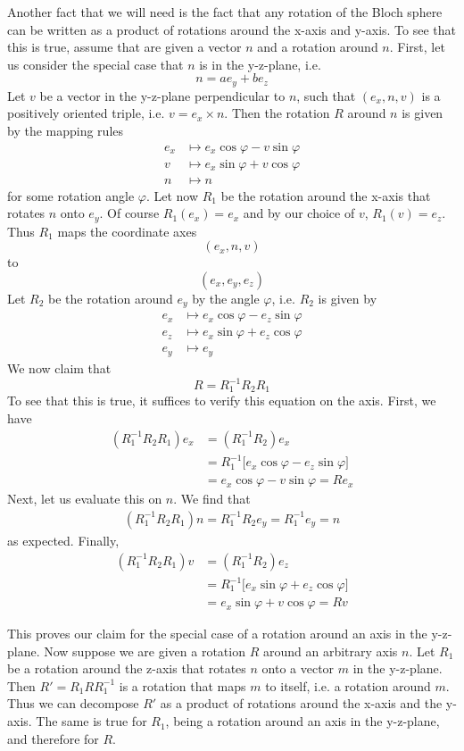 \documentclass[a4paper, draft]{article}
\theoremstyle{own}
\theoremstyle{remark}
\begin{document}
Another fact that we will need is the fact that any rotation of the Bloch sphere can be written as a product of rotations around the x-axis and y-axis. To see that this is true, assume that are given a vector $n$ and a rotation around $n$. First, let us consider the special case that $n$ is in the y-z-plane, i.e.
$$
n = a e_y + b e_z
$$
Let $v$ be a vector in the y-z-plane perpendicular to $n$, such that $(e_x, n, v)$ is a positively oriented triple, i.e. $v = e_x \times n$. Then the rotation $R$ around $n$ is given by the mapping rules
\begin{align*}
e_x &\mapsto e_x \cos \varphi - v \sin \varphi \\
v & \mapsto e_x \sin \varphi +v  \cos \varphi \\
n & \mapsto n
\end{align*}
for some rotation angle $\varphi$. Let now $R_1$ be the rotation around the x-axis that rotates $n$ onto $e_y$. Of course $R_1(e_x) = e_x$ and by our choice of $v$, $R_1(v) = e_z$. Thus $R_1$ maps the coordinate axes
$$
(e_x, n, v)
$$
to 
$$
(e_x, e_y, e_z)
$$
Let $R_2$ be the rotation around $e_y$ by the angle $\varphi$, i.e. $R_2$ is given by
\begin{align*}
e_x &\mapsto e_x \cos \varphi - e_z \sin \varphi \\
e_z & \mapsto e_x \sin \varphi + e_z  \cos \varphi \\
e_y & \mapsto e_y
\end{align*}
We now claim that
$$
R = R_1^{-1} R_2 R_1
$$
To see that this is true, it suffices to verify this equation on the axis. First, we have
\begin{align*}
(R_1^{-1} R_2 R_1) e_x &= (R_1^{-1} R_2) e_x \\
&= R_1^{-1} \big[ e_x \cos \varphi - e_z \sin \varphi \big] \\
&= e_x \cos \varphi - v \sin \varphi = Re_x
\end{align*}
Next, let us evaluate this on $n$. We find that
\begin{align*}
(R_1^{-1} R_2 R_1) n = R_1^{-1} R_2 e_y = R_1^{-1} e_y = n
\end{align*}
as expected. Finally, 
\begin{align*}
(R_1^{-1} R_2 R_1) v &= (R_1^{-1} R_2) e_z \\
&= R_1^{-1} \big[ e_x \sin \varphi + e_z \cos \varphi \big] \\
&= e_x \sin \varphi + v \cos \varphi = Rv
\end{align*}

This proves our claim for the special case of a rotation around an axis in the y-z-plane. Now suppose we are given a rotation $R$ around an arbitrary axis $n$. Let $R_1$ be a rotation around the z-axis that rotates $n$ onto a vector $m$ in the y-z-plane. Then $R' = R_1 R R_1^{-1}$ is a rotation that maps $m$ to itself, i.e. a rotation around $m$. Thus we can decompose $R'$ as a product of rotations around the x-axis and the y-axis. The same is true for $R_1$, being a rotation around an axis in the y-z-plane, and therefore for $R$. 
\end{document}
